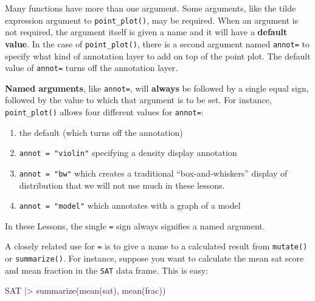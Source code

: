 \documentclass[
  letterpaper,
  DIV=11,
  numbers=noendperiod,
  oneside]{scrartcl}
\newenvironment{Shaded}{\begin{snugshade}}{\end{snugshade}}
\newcommand{\FunctionTok}[1]{\textcolor[rgb]{0.28,0.35,0.67}{#1}}
\newcommand{\NormalTok}[1]{\textcolor[rgb]{0.00,0.23,0.31}{#1}}
\newcommand{\SpecialCharTok}[1]{\textcolor[rgb]{0.37,0.37,0.37}{#1}}
\providecommand{\tightlist}{%
  \setlength{\itemsep}{0pt}\setlength{\parskip}{0pt}}\usepackage{longtable,booktabs,array}
\begin{document}
Many functions have more than one argument. Some arguments, like the
tilde expression argument to \texttt{point\_plot()}, may be required.
When an argument is not required, the argument itself is given a name
and it will have a \textbf{default value}. In the case of
\texttt{point\_plot()}, there is a second argument named \texttt{annot=}
to specify what kind of annotation layer to add on top of the point
plot. The default value of \texttt{annot=} turns off the annotation
layer.

\textbf{Named arguments}, like \texttt{annot=}, will \textbf{always} be
followed by a single equal sign, followed by the value to which that
argument is to be set. For instance, \texttt{point\_plot()} allows four
different values for \texttt{annot=}:

\begin{enumerate}
\def\labelenumi{\roman{enumi}.}
\tightlist
\item
  the default (which turns off the annotation)
\item
  \texttt{annot\ =\ "violin"} specifying a density display annotation
\item
  \texttt{annot\ =\ "bw"} which creates a traditional
  ``box-and-whiskers'' display of distribution that we will not use much
  in these lessons.
\item
  \texttt{annot\ =\ "model"} which annotates with a graph of a model
\end{enumerate}

In these Lessons, the single \texttt{=} sign always signifies a named
argument.
{}

A closely related use for \texttt{=} is to give a name to a calculated
result from \texttt{mutate()} or \texttt{summarize()}. For instance,
suppose you want to calculate the mean sat score and mean fraction in
the \texttt{SAT} data frame. This is easy:

\begin{Shaded}
\begin{Highlighting}[]
\NormalTok{SAT }\SpecialCharTok{|\textgreater{}} \FunctionTok{summarize}\NormalTok{(}\FunctionTok{mean}\NormalTok{(sat), }\FunctionTok{mean}\NormalTok{(frac))}
\end{Highlighting}
\end{Shaded}
\end{document}
